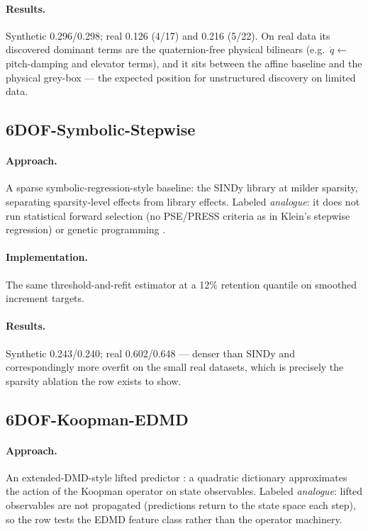 \documentclass[11pt]{article}
\begin{document}
\paragraph{Results.} Synthetic 0.296/0.298; real 0.126 (4/17) and 0.216
(5/22). On real data its discovered dominant terms are the quaternion-free
physical bilinears (e.g.\ $\dot q\leftarrow$ pitch-damping and elevator
terms), and it sits between the affine baseline and the physical grey-box
--- the expected position for unstructured discovery on limited data.

\subsection{6DOF-Symbolic-Stepwise}
\paragraph{Approach.} A sparse symbolic-regression-style baseline: the SINDy
library at milder sparsity, separating sparsity-level effects from library
effects. Labeled \emph{analogue}: it does not run statistical forward
selection (no PSE/PRESS criteria as in Klein's stepwise regression) or
genetic programming \cite{koza1990genetic}.
\paragraph{Implementation.} The same threshold-and-refit estimator at a
12\% retention quantile on smoothed increment targets.
\paragraph{Results.} Synthetic 0.243/0.240; real 0.602/0.648 --- denser
than SINDy and correspondingly more overfit on the small real datasets,
which is precisely the sparsity ablation the row exists to show.

\subsection{6DOF-Koopman-EDMD}
\paragraph{Approach.} An extended-DMD-style lifted predictor
\cite{koopman1931hamiltonian,williams2015data,schmid2010dmd}: a quadratic
dictionary approximates the action of the Koopman operator on state
observables. Labeled \emph{analogue}: lifted observables are not propagated
(predictions return to the state space each step), so the row tests the
EDMD feature class rather than the operator machinery.
\end{document}
